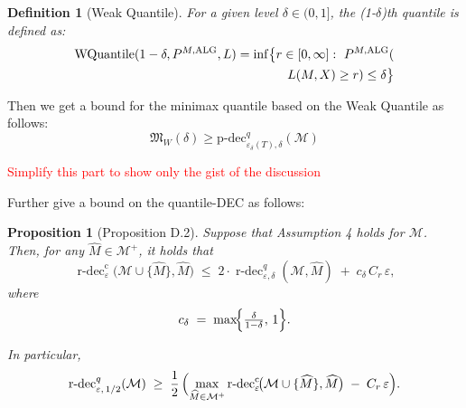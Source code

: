 \documentclass[conference]{IEEEtran}
\newtheorem{definition}{Definition}
\newtheorem{proposition}{Proposition}
\begin{document}
\begin{definition}[Weak Quantile]
For a given level $\delta \in (0,1]$, the (1-$\delta$)th quantile is defined as:
\begin{align*}
\textup{WQuantile}(1-\delta, P^{M,\textup{ALG}}, L) 
= \inf \bigl\{ r \in [0, \infty] :\  
P^{M,\textup{ALG}}( \\
L(M,X) \geq r ) \leq \delta \bigr\}
\end{align*}\end{definition}

Then we get a bound for the minimax quantile based on the Weak Quantile as follows:
\[
\mathfrak{M}_W(\delta) \geq \text{p-dec}_{\varepsilon_{\delta}(T),\delta}^{q}(\mathcal{M})
\]

\textcolor{red}{Simplify this part to show only the gist of the discussion}

Further \cite{chen2024assouad} give a bound on the quantile-DEC as follows:

\begin{proposition}[Proposition D.2]
Suppose that Assumption 4 holds for $\mathcal{M}$.  
Then, for any $\widehat{M}\in\mathcal{M}^{+}$, it holds that
\[
\operatorname{r\text{-}dec}^{\mathrm{c}}_{\varepsilon}\!\bigl(\mathcal{M}\cup\{\widehat{M}\},\widehat{M}\bigr)
   \;\le\;
   2\cdot\operatorname{r\text{-}dec}^{q}_{\varepsilon,\delta}(\mathcal{M},\widehat{M})
   \;+\;
   c_{\delta}\,C_{r}\,\varepsilon,
\]
where
\[
c_{\delta}\;=\;\max\!\Bigl\{\tfrac{\delta}{1-\delta},\,1\Bigr\}.
\]

In particular,
\[
\operatorname{r\text{-}dec}^{q}_{\varepsilon,\,1/2}(\mathcal{M})
   \;\ge\;
   \frac{1}{2}\,
   \Bigl(
      \max_{\widehat{M}\in\mathcal{M}^{+}}
      \operatorname{r\text{-}dec}^{\mathrm{c}}_{\varepsilon}\!\bigl(\mathcal{M}\cup\{\widehat{M}\},\widehat{M}\bigr)
      \;-\;
      C_{r}\,\varepsilon
   \Bigr).
\]
\end{proposition}
\end{document}
